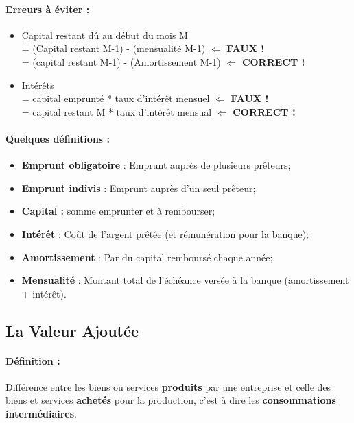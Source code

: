 \paragraph{Erreurs à éviter :}
\begin{itemize}
	\item Capital restant d\^u au début du mois M\\
	= (Capital restant M-1) - (mensualité M-1) $\Longleftarrow$ \textbf{FAUX !}\\
	= (capital restant M-1) - (Amortissement M-1) $\Longleftarrow$ \textbf{CORRECT !}
	
	\item Intérêts\\
	= capital emprunté * taux d'intérêt mensuel $\Longleftarrow$ \textbf{FAUX !}\\
	= capital restant M * taux d'intér\^et mensual $\Longleftarrow$ \textbf{CORRECT !}
\end{itemize}

\paragraph{Quelques définitions :}
\begin{itemize}
	\item \textbf{Emprunt obligatoire} : Emprunt auprès de plusieurs pr\^eteurs;
	\item \textbf{Emprunt indivis} : Emprunt auprès d'un seul pr\^eteur;
	\item \textbf{Capital :} somme emprunter et à rembourser;
	\item \textbf{Intérêt} : Coût de l'argent prêtée (et rémunération pour la banque);
	\item \textbf{Amortissement} : Par du capital remboursé chaque année;
	\item \textbf{Mensualité} : Montant total de l'échéance versée à la banque (amortissement + intérêt).
\end{itemize}


\subsection{La Valeur Ajoutée}
\paragraph{Définition :} Différence entre les biens ou services \textbf{produits} par une entreprise et celle des biens et services \textbf{achetés} pour la production, c'est à dire les \textbf{consommations intermédiaires}.\\

